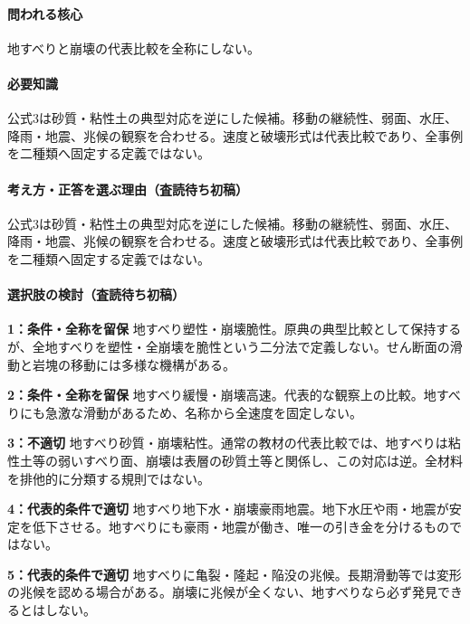 \paragraph{問われる核心} 地すべりと崩壊の代表比較を全称にしない。

\paragraph{必要知識} 公式3は砂質・粘性土の典型対応を逆にした候補。移動の継続性、弱面、水圧、降雨・地震、兆候の観察を合わせる。速度と破壊形式は代表比較であり、全事例を二種類へ固定する定義ではない。

\paragraph{考え方・正答を選ぶ理由（査読待ち初稿）} 公式3は砂質・粘性土の典型対応を逆にした候補。移動の継続性、弱面、水圧、降雨・地震、兆候の観察を合わせる。速度と破壊形式は代表比較であり、全事例を二種類へ固定する定義ではない。

\paragraph{選択肢の検討（査読待ち初稿）}\mbox{}\par

\noindent\textbf{1：条件・全称を留保} 地すべり塑性・崩壊脆性。原典の典型比較として保持するが、全地すべりを塑性・全崩壊を脆性という二分法で定義しない。せん断面の滑動と岩塊の移動には多様な機構がある。\par

\noindent\textbf{2：条件・全称を留保} 地すべり緩慢・崩壊高速。代表的な観察上の比較。地すべりにも急激な滑動があるため、名称から全速度を固定しない。\par

\noindent\textbf{3：不適切} 地すべり砂質・崩壊粘性。通常の教材の代表比較では、地すべりは粘性土等の弱いすべり面、崩壊は表層の砂質土等と関係し、この対応は逆。全材料を排他的に分類する規則ではない。\par

\noindent\textbf{4：代表的条件で適切} 地すべり地下水・崩壊豪雨地震。地下水圧や雨・地震が安定を低下させる。地すべりにも豪雨・地震が働き、唯一の引き金を分けるものではない。\par

\noindent\textbf{5：代表的条件で適切} 地すべりに亀裂・隆起・陥没の兆候。長期滑動等では変形の兆候を認める場合がある。崩壊に兆候が全くない、地すべりなら必ず発見できるとはしない。\par

